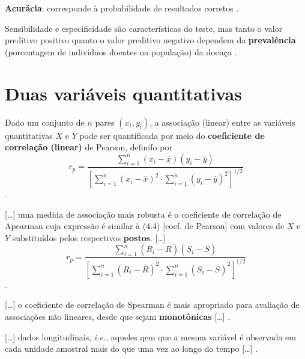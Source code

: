 \documentclass[
]{latex/krantz}
\renewenvironment{quote}{\begin{VF}}{\end{VF}}
\theoremstyle{definition}
\theoremstyle{definition}
\theoremstyle{definition}
\theoremstyle{definition}
\theoremstyle{remark}
\begin{document}
\begin{quote}
\textbf{Acurácia}: corresponde à probabilidade de resultados corretos \citep[p.~89]{MorettinSinger2022}.
\end{quote}

\begin{quote}
Sensibilidade e especificidade são características do teste, mas tanto o valor preditivo positivo quanto o valor preditivo negativo dependem da \textbf{prevalência} (porcentagem de indivíduos doentes na população) da doença \citep[p.~89]{MorettinSinger2022}.
\end{quote}

\hypertarget{duas-variuxe1veis-quantitativas}{%
\section{Duas variáveis quantitativas}\label{duas-variuxe1veis-quantitativas}}

\begin{quote}
Dado um conjunto de \(n\) pares \((x_i, y_i)\), a associação (linear) entre as variáveis quantitativas \(X\) e \(Y\) pode ser quantificada por meio do \textbf{coeficiente de correlação (linear)} de Pearson, definifo por \[r_p = \frac{\sum \limits_{i=1}^{n}(x_i - \overline{x})(y_i - \overline{y})}{\left[ \sum \limits_{i = 1}^{n}(x_i - \overline{x})^2 \cdot \sum\limits_{i=1}^{n}(y_i - \overline{y})^2  \right]^{1/2}}\] \citep[p.~91]{MorettinSinger2022}.
\end{quote}

\begin{quote}
{[}\ldots{]} uma medida de associação mais robusta é o coeficiente de correlação de Apearman cuja expressão é similar à (4.4) {[}coef. de Pearson{]} com valores de \(X\) e \(Y\) substituídos pelos respectivos \textbf{postos}. {[}\ldots{]} \[r_p = \frac{\sum \limits_{i=1}^{n}(R_i - \overline{R})(S_i - \overline{S})}{\left[ \sum \limits_{i = 1}^{n}(R_i - \overline{R})^2 \cdot \sum\limits_{i=1}^{n}(S_i - \overline{S})^2  \right]^{1/2}}\] \citep[p.~92]{MorettinSinger2022}.
\end{quote}

\begin{quote}
{[}\ldots{]} o coeficiente de correlação de Spearman é mais apropriado para avaliação de associações não lineares, desde que sejam \textbf{monotônicas} {[}\ldots{]} \citep[p.~93]{MorettinSinger2022}.
\end{quote}

\begin{quote}
{[}\ldots{]} dados longitudinais, \emph{i.e.}, aqueles qem que a mesma variável é observada em cada unidade amostral mais do que uma vez ao longo do tempo {[}\ldots{]} \citep[p.~95]{MorettinSinger2022}.
\end{quote}
\end{document}
